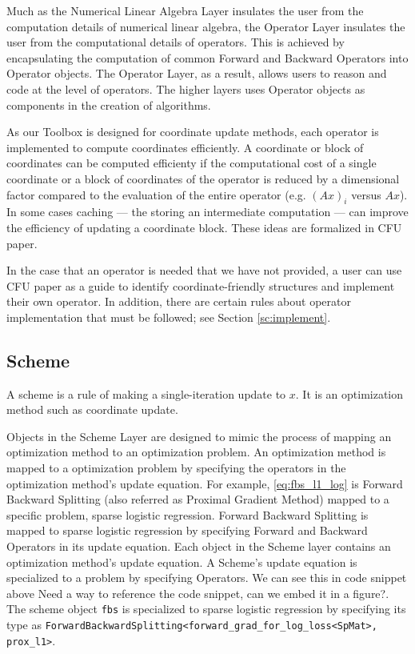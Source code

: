 Much as the Numerical Linear Algebra Layer insulates the user from the computation details of numerical linear algebra, the Operator Layer insulates the user from the computational details of operators. This is achieved by encapsulating the computation of common Forward and Backward Operators into Operator objects.  The Operator Layer, as a result, allows users to reason and code at the level of operators. The higher layers uses Operator objects as components in the creation of algorithms. 

As our Toolbox is designed for coordinate update methods, each operator is implemented to compute coordinates efficiently. A coordinate or block of coordinates can be computed efficienty if the computational cost of a single coordinate or a block of coordinates of the operator is reduced by a dimensional factor compared to the evaluation of the entire operator (e.g. $(Ax)_i$ versus $Ax$). In some cases caching --- the storing an intermediate computation --- can improve the efficiency of updating a coordinate block. These ideas are formalized in CFU paper.

In the case that an operator is needed that we have not provided, a user can use CFU paper as a guide to identify coordinate-friendly structures and implement their own operator. In addition, there are certain rules about operator implementation that must be followed; see Section \ref{sc:implement}.


\subsection{Scheme}
A scheme is a rule of making a single-iteration update to $x$. It is an optimization method such as coordinate update.

Objects in the Scheme Layer are designed to mimic the process of mapping an optimization method to an optimization problem.
An optimization method is mapped to a optimization problem by specifying the operators in the optimization method's update equation.
For example, \eqref{eq:fbs_l1_log} is Forward Backward Splitting (also referred as Proximal Gradient Method) mapped to a specific problem, sparse logistic regression.
Forward Backward Splitting is mapped to sparse logistic regression by specifying Forward and Backward Operators in its update equation.
Each object in the Scheme layer contains an optimization method's update equation.
A Scheme's update equation is specialized to a problem by specifying Operators. We can see this in code snippet above {\color{red} Need a way to reference the code snippet, can we embed it in a figure?}.
The scheme object \texttt{fbs} is specialized to sparse logistic regression by specifying its type as \texttt{ForwardBackwardSplitting<forward\_grad\_for\_log\_loss<SpMat>, prox\_l1>}.

